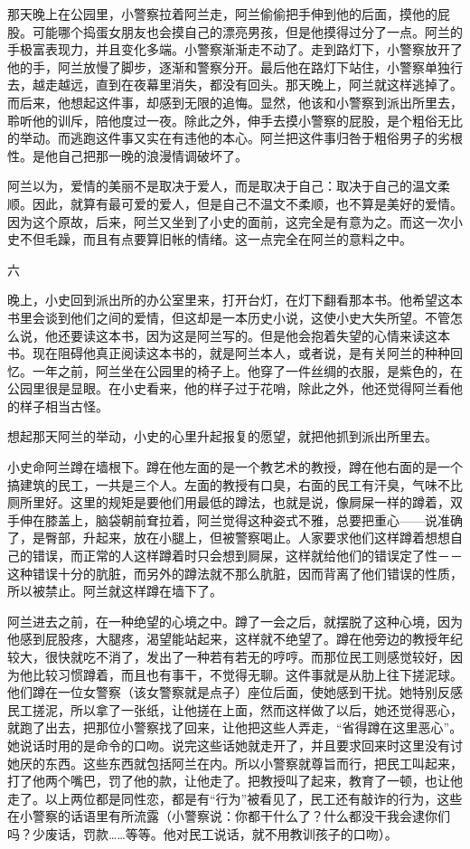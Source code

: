 那天晚上在公园里，小警察拉着阿兰走，阿兰偷偷把手伸到他的后面，摸他的屁股。可能哪个捣蛋女朋友也会摸自己的漂亮男孩，但是他摸得过分了一点。阿兰的手极富表现力，并且变化多端。小警察渐渐走不动了。走到路灯下，小警察放开了他的手，阿兰放慢了脚步，逐渐和警察分开。最后他在路灯下站住，小警察单独行去，越走越远，直到在夜幕里消失，都没有回头。那天晚上，阿兰就这样逃掉了。而后来，他想起这件事，却感到无限的追悔。显然，他该和小警察到派出所里去，聆听他的训斥，陪他度过一夜。除此之外，伸手去摸小警察的屁股，是个粗俗无比的举动。而逃跑这件事又实在有违他的本心。阿兰把这件事归咎于粗俗男子的劣根性。是他自己把那一晚的浪漫情调破坏了。 

阿兰以为，爱情的美丽不是取决于爱人，而是取决于自己：取决于自己的温文柔顺。因此，就算有最可爱的爱人，但是自己不温文不柔顺，也不算是美好的爱情。因为这个原故，后来，阿兰又坐到了小史的面前，这完全是有意为之。而这一次小史不但毛躁，而且有点要算旧帐的情绪。这一点完全在阿兰的意料之中。 

六 

晚上，小史回到派出所的办公室里来，打开台灯，在灯下翻看那本书。他希望这本书里会谈到他们之间的爱情，但这却是一本历史小说，这使小史大失所望。不管怎么说，他还要读这本书，因为这是阿兰写的。但是他会抱着失望的心情来读这本书。现在阻碍他真正阅读这本书的，就是阿兰本人，或者说，是有关阿兰的种种回忆。一年之前，阿兰坐在公园里的椅子上。他穿了一件丝绸的衣服，是紫色的，在公园里很是显眼。在小史看来，他的样子过于花哨，除此之外，他还觉得阿兰看他的样子相当古怪。 

想起那天阿兰的举动，小史的心里升起报复的愿望，就把他抓到派出所里去。 

小史命阿兰蹲在墙根下。蹲在他左面的是一个教艺术的教授，蹲在他右面的是一个搞建筑的民工，一共是三个人。左面的教授有口臭，右面的民工有汗臭，气味不比厕所里好。这里的规矩是要他们用最低的蹲法，也就是说，像屙屎一样的蹲着，双手伸在膝盖上，脑袋朝前耷拉着，阿兰觉得这种姿式不雅，总要把重心——说准确了，是臀部，升起来，放在小腿上，但被警察喝止。人家要求他们这样蹲着想想自己的错误，而正常的人这样蹲着时只会想到屙屎，这样就给他们的错误定了性－－这种错误十分的肮脏，而另外的蹲法就不那么肮脏，因而背离了他们错误的性质，所以被禁止。阿兰就这样蹲在墙下了。 

阿兰进去之前，在一种绝望的心境之中。蹲了一会之后，就摆脱了这种心境，因为他感到屁股疼，大腿疼，渴望能站起来，这样就不绝望了。蹲在他旁边的教授年纪较大，很快就吃不消了，发出了一种若有若无的哼哼。而那位民工则感觉较好，因为他比较习惯蹲着，而且也有事干，不觉得无聊。这件事就是从肋上往下搓泥球。他们蹲在一位女警察（该女警察就是点子）座位后面，使她感到干扰。她特别反感民工搓泥，所以拿了一张纸，让他搓在上面，然而这样做了以后，她还觉得恶心，就跑了出去，把那位小警察找了回来，让他把这些人弄走，“省得蹲在这里恶心”。她说话时用的是命令的口吻。说完这些话她就走开了，并且要求回来时这里没有讨她厌的东西。这些东西就包括阿兰在内。所以小警察就尊旨而行，把民工叫起来，打了他两个嘴巴，罚了他的款，让他走了。把教授叫了起来，教育了一顿，也让他走了。以上两位都是同性恋，都是有“行为”被看见了，民工还有敲诈的行为，这些在小警察的话语里有所流露（小警察说：你都干什么了？什么都没干我会逮你们吗？少废话，罚款……等等。他对民工说话，就不用教训孩子的口吻）。 


